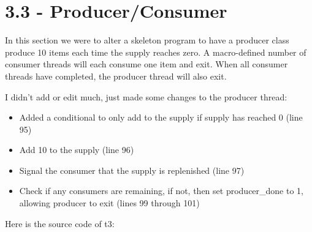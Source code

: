 \documentclass[11pt]{report}
\begin{document}
\section*{3.3 - Producer/Consumer}

In this section we were to alter a skeleton program to have a producer class produce 10 items each time the supply reaches zero. A macro-defined number of consumer threads will each consume one item and exit. When all consumer threads have completed, the producer thread will also exit.

I didn't add or edit much, just made some changes to the producer thread:
\begin{itemize}
\item Added a conditional to only add to the supply if supply has reached 0 (line 95)
\item Add 10 to the supply (line 96)
\item Signal the consumer that the supply is replenished (line 97)
\item Check if any consumers are remaining, if not, then set producer\_done to 1, allowing producer to exit (lines 99 through 101)
\end{itemize}


Here is the source code of t3:
\end{document}
